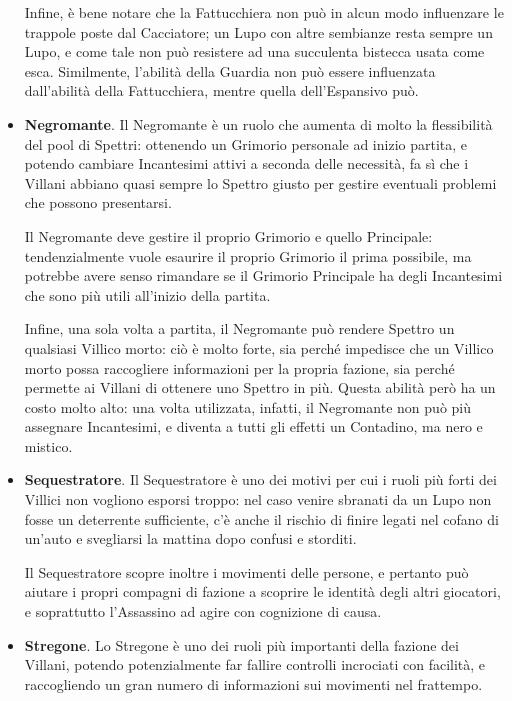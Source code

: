 \documentclass[a4paper,10pt]{article}
\begin{document}
\begin{itemize}
    Infine, è bene notare che la Fattucchiera non può in alcun modo influenzare le trappole poste dal Cacciatore; un Lupo con altre sembianze resta sempre un Lupo, e come tale non può resistere ad una succulenta bistecca usata come esca. Similmente, l'abilità della Guardia non può essere influenzata dall'abilità della Fattucchiera, mentre quella dell'Espansivo può.
	
	\item {\bf Negromante}. Il Negromante è un ruolo che aumenta di molto la flessibilità del pool di Spettri: ottenendo un Grimorio personale ad inizio partita, e potendo cambiare Incantesimi attivi a seconda delle necessità, fa sì che i Villani abbiano quasi sempre lo Spettro giusto per gestire eventuali problemi che possono presentarsi.
	
	Il Negromante deve gestire il proprio Grimorio e quello Principale: tendenzialmente vuole esaurire il proprio Grimorio il prima possibile, ma potrebbe avere senso rimandare se il Grimorio Principale ha degli Incantesimi che sono più utili all'inizio della partita.
	
	Infine, una sola volta a partita, il Negromante può rendere Spettro un qualsiasi Villico morto: ciò è molto forte, sia perché impedisce che un Villico morto possa raccogliere informazioni per la propria fazione, sia perché permette ai Villani di ottenere uno Spettro in più. Questa abilità però ha un costo molto alto: una volta utilizzata, infatti, il Negromante non può più assegnare Incantesimi, e diventa a tutti gli effetti un Contadino, ma nero e mistico.
	
	\item {\bf Sequestratore}. Il Sequestratore è uno dei motivi per cui i ruoli più forti dei Villici non vogliono esporsi troppo: nel caso venire sbranati da un Lupo non fosse un deterrente sufficiente, c'è anche il rischio di finire legati nel cofano di un'auto e svegliarsi la mattina dopo confusi e storditi.
	
	Il Sequestratore scopre inoltre i movimenti delle persone, e pertanto può aiutare i propri compagni di fazione a scoprire le identità degli altri giocatori, e soprattutto l'Assassino ad agire con cognizione di causa.
	
	\item {\bf Stregone}. Lo Stregone è uno dei ruoli più importanti della fazione dei Villani, potendo potenzialmente far fallire controlli incrociati con facilità, e raccogliendo un gran numero di informazioni sui movimenti nel frattempo.
	

\end{itemize}
\end{document}
